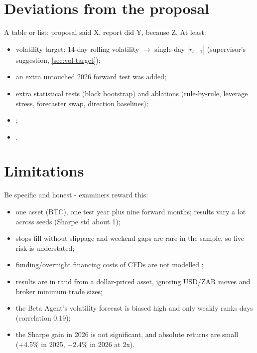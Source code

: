\section{Deviations from the proposal}\label{sec:deviations}
\begin{guide}
A table or list: proposal said X, report did Y, because Z. At least:
\begin{itemize}
  \item volatility target: 14-day rolling volatility $\to$ single-day $|r_{t+1}|$ (supervisor's suggestion, \cref{sec:vol-target});
  \item an extra untouched 2026 forward test was added;
  \item extra statistical tests (block bootstrap) and ablations (rule-by-rule, leverage stress, forecaster swap, direction baselines);
  \item {};
  \item {}.
\end{itemize}
\end{guide}
\tbc{}

\section{Limitations}
\begin{guide}
Be specific and honest - examiners reward this:
\begin{itemize}
  \item one asset (BTC), one test year plus nine forward months; results vary a lot across seeds (Sharpe std about 1);
  \item stops fill without slippage and weekend gaps are rare in the sample, so live risk is understated;
  \item funding/overnight financing costs of CFDs are not modelled ;
  \item results are in rand from a dollar-priced asset, ignoring USD/ZAR moves and broker minimum trade sizes;
  \item the Beta Agent's volatility forecast is biased high and only weakly ranks days (correlation 0.19);
  \item the Sharpe gain in 2026 is not significant, and absolute returns are small (+4.5\% in 2025, +2.4\% in 2026 at 2x).
\end{itemize}
\end{guide}
\tbc{}
